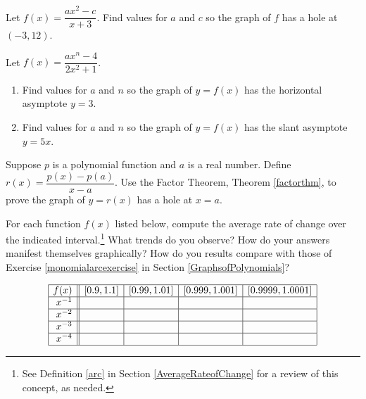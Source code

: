 \documentclass{ximera}
\begin{document}
\begin{problem}
Let $f(x) = \dfrac{ax^2-c}{x+3}$.  Find values  for $a$ and  $c$ so  the graph of $f$ has a hole  at $(-3, 12)$.
\end{problem}

\begin{problem}
Let $f(x) = \dfrac{ax^{n} -4}{2x^2+1}$.

\begin{enumerate}

\item  Find values for $a$ and $n$ so the graph of $y = f(x)$  has the horizontal asymptote $y = 3$.

\item  Find values for $a$ and $n$ so the graph of  $y=f(x)$ has the slant asymptote $y = 5x$.

\end{enumerate}
\end{problem}

\begin{problem}
Suppose $p$ is a polynomial function and $a$ is a real number.  Define $r(x)= \dfrac{p(x) - p(a)}{x-a}$.  Use the Factor Theorem, Theorem \ref{factorthm}, to prove the graph of $y = r(x)$ has a hole at $x =a$.
\end{problem}

\begin{problem}\label{laurentarcexercise}
For each function $f(x)$ listed below, compute the average rate of change over the indicated interval.\footnote{See Definition \ref{arc} in Section \ref{AverageRateofChange} for a review of this concept, as needed.}  What trends do you observe?  How do your answers manifest themselves graphically?  How do you results compare with those of Exercise \ref{monomialarcexercise} in Section \ref{GraphsofPolynomials}?

\vspace*{-0.2in}

\[ \begin{array}{|r||c|c|c|c|}  \hline

 f(x) &  [0.9, 1.1] & [0.99, 1.01] &[0.999, 1.001] & [0.9999, 1.0001]  \\ \hline
 x^{-1} &&&&   \\  \hline
 x^{-2} &&&&    \\  \hline
 x^{-3} &&&&   \\  \hline
 x^{-4} &&&&   \\  \hline
\end{array} \]
\end{problem}
\end{document}
